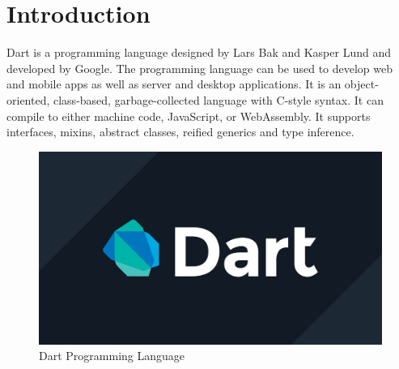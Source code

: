 \section{Introduction}
Dart is a programming language designed by Lars Bak and Kasper Lund and developed by Google. The programming language can be used to develop web and mobile apps as well as server and desktop applications.
It is an object-oriented, class-based, garbage-collected language with C-style syntax. It can compile to either machine code, JavaScript, or WebAssembly. It supports interfaces, mixins, abstract classes, reified generics and type inference.\cite{enwiki:1155641282}

\begin{figure}[H]
    \centering
    \includegraphics[scale=0.2]{media/dart-logo.jpg}
    \caption{Dart Programming Language}
    \label{fig:dart-logo}
\end{figure}

